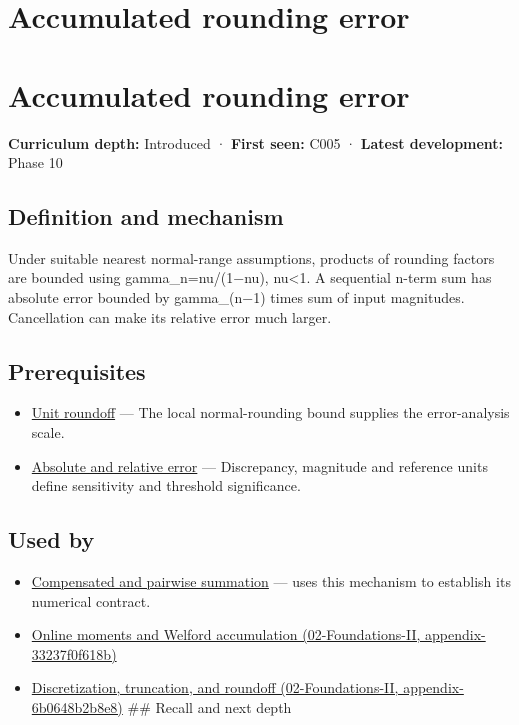 \hypertarget{appendix-f82e270791c8}{}
\section*{Accumulated rounding error}
\section{Accumulated rounding error}\label{appendix-f82e270791c8-accumulated-rounding-error}

\textbf{Curriculum depth:} Introduced · \textbf{First seen:} C005 · \textbf{Latest development:} Phase 10

\subsection{Definition and mechanism}\label{appendix-f82e270791c8-definition-and-mechanism}

Under suitable nearest normal-range assumptions, products of rounding factors are bounded using gamma\_n=nu/(1−nu), nu\textless1. A sequential n-term sum has absolute error bounded by gamma\_(n−1) times sum of input magnitudes. Cancellation can make its relative error much larger.

\subsection{Prerequisites}\label{appendix-f82e270791c8-prerequisites}

\begin{itemize}
\tightlist
\item
  \hyperref[appendix-bc44f7b42f42]{Unit roundoff} --- The local normal-rounding bound supplies the error-analysis scale.
\item
  \hyperref[appendix-3ae74e89b4e6]{Absolute and relative error} --- Discrepancy, magnitude and reference units define sensitivity and threshold significance.
\end{itemize}

\subsection{Used by}\label{appendix-f82e270791c8-used-by}

\begin{itemize}
\item
  \hyperref[appendix-df318da57389]{Compensated and pairwise summation} --- uses this mechanism to establish its numerical contract.
\item
  \href{../02-Foundations-II/main.pdf\#nameddest=appendix-33237f0f618b}{Online moments and Welford accumulation (02-Foundations-II, appendix-33237f0f618b)}
\item
  \href{../02-Foundations-II/main.pdf\#nameddest=appendix-6b0648b2b8e8}{Discretization, truncation, and roundoff (02-Foundations-II, appendix-6b0648b2b8e8)} \#\# Recall and next depth
\end{itemize}

